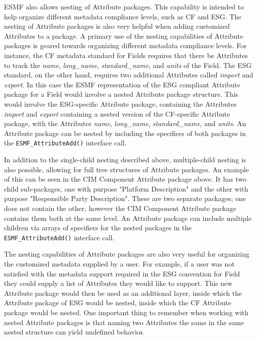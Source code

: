 ESMF also allows nesting of Attribute packages.  This capability is intended to help organize different metadata compliance levels, such as CF and ESG.  The nesting of Attribute packages is also very helpful when adding customized Attributes to a package.  A primary use of the nesting capabilities of Attribute packages is geared towards organizing different metadata compliance levels.  For instance, the CF metadata standard for Fields requires that there be Attributes to track the {\it name}, {\it long\_name}, {\it standard\_name}, and {\it units} of the Field.  The ESG standard, on the other hand, requires two additional Attributes called {\it import} and {\it export}.  In this case the ESMF representation of the ESG compliant Attribute package for a Field would involve a nested Attribute package structure.  This would involve the ESG-specific Attribute package, containing the Attributes {\it import} and {\it export} containing a nested version of the CF-specific Attribute package, with the Attributes {\it name}, {\it long\_name}, {\it standard\_name}, and {\it units}.  An Attribute package can be nested by including the specifiers of both packages in the {\tt ESMF\_AttributeAdd()} interface call.  

In addition to the single-child nesting described above, multiple-child nesting is also possible, allowing for full tree structures of Attribute packages.  An example of this can be seen in the CIM Component Attribute package above.  It has two child sub-packages, one with purpose "Platform Description" and the other with purpose "Responsible Party Description".  These are two separate packages; one does not contain the other, however the CIM Component Attribute package contains them both at the same level.  An Attribute package can include multiple children via arrays of specifiers for the nested packages in the {\tt ESMF\_AttributeAdd()} interface call.

The nesting capabilities of Attribute packages are also very useful for organizing the customized metadata supplied by a user.  For example, if a user was not satisfied with the metadata support required in the ESG convention for Field they could supply a list of Attributes they would like to support.  This new Attribute package would then be used as an additional layer, inside which the Attribute package of ESG would be nested, inside which the CF Attribute package would be nested.  One important thing to remember when working with nested Attribute packages is that naming two Attributes the same in the same nested structure can yield undefined behavior.

